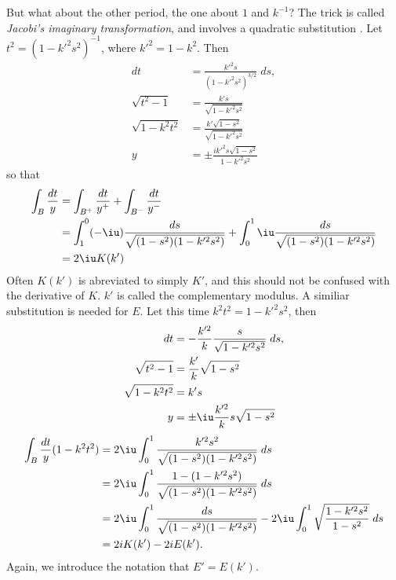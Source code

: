 But what about the other period, the one about $1$ and $k^{-1}$? The trick is called {\it Jacobi's imaginary transformation}, and involves a quadratic substitution \cite{Whittaker2000}. Let $t^2 = (1-k'^2 s^2)^{-1}$, where $k'^2 = 1 - k^2$. Then
\begin{align*}
dt &= \frac{k'^2 s}{(1-k'^2 s^2)^{3/2}}\;ds, \\
\sqrt{t^2 - 1} &= \frac{k's}{\sqrt{1-k'^2 s^2}} \\
\sqrt{1 - k^2 t^2} &= \frac{k' \sqrt{1-s^2}}{\sqrt{1-k'^2 s^2}} \\
y &= \pm \frac{i k'^2 s \sqrt {1-s^2}}{1-k'^2 s^2}
\end{align*}
so that
\begin{align*}
\int_B \frac{dt}{y}
&= \int_{B^+} \frac{dt}{y^+} + \int_{B^-} \frac{dt}{y^-} \\
&= \int_1^0 (-\iu) \frac{ds}{\sqrt{(1-s^2)(1-k'^2 s^2)}} + \int_0^1 \iu \frac{ds}{\sqrt{(1-s^2)(1-k'^2 s^2)}}\\
&= 2\iu K(k')
\end{align*}
Often $K(k')$ is abreviated to simply $K'$, and this should not be confused with the derivative of $K$. $k'$ is called the complementary modulus. A similiar substitution is needed for $E$. Let this time $k^2 t^2 = 1-k'^2 s^2$, then
\begin{align*}
dt &= -\frac{k'^2}{k} \frac{s}{\sqrt{1-k'^2 s^2}}\;ds,\\
\sqrt{t^2 - 1} &= \frac{k'}{k}\sqrt{1-s^2} \\
\sqrt{1 - k^2 t^2} &= k's\\
y &= \pm \iu \frac{k'^2}{k}s\sqrt{1-s^2}
\end{align*}
\begin{align*}
\int_B \frac{dt}{y}(1-k^2t^2)
&= 2\iu \int_0^1 \frac{k'^2 s^2}{\sqrt{(1-s^2)(1-k'^2 s^2)}}\;ds \\
&= 2\iu \int_0^1 \frac{1-(1-k'^2 s^2)}{\sqrt{(1-s^2)(1-k'^2 s^2)}}\;ds \\
&= 2\iu \int_0^1 \frac{ds}{\sqrt{(1-s^2)(1-k'^2 s^2)}} - 2\iu \int_0^1 \sqrt{\frac{1-k'^2 s^2}{1-s^2}}\;ds\\
&= 2iK(k') - 2iE(k').
\end{align*}
Again, we introduce the notation that $E' = E(k')$.

















